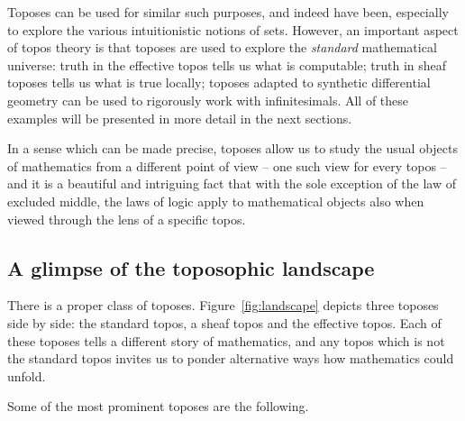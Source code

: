 \documentclass[graybox]{svmult}
\renewcommand{\_}{\mathpunct{.}\,}
\newcommand{\effective}{ef{}fective\xspace}
\newcommand{\?}{\,{:}\,}
\begin{document}
Toposes can be used for similar such purposes, and indeed have been,
especially to explore the various intuitionistic notions of sets. However, an important
aspect of topos theory is that toposes are used to explore the \emph{standard}
mathematical universe: truth in the \effective topos tells us what is
computable; truth in sheaf toposes tells us what is true locally; toposes
adapted to synthetic differential geometry can be used to rigorously work with
infinitesimals. All of these examples will be presented in more detail in the
next sections.

In a sense which can be made precise, toposes allow us to study the usual
objects of mathematics from a different point of view -- one such view for
every topos -- and it is a beautiful and intriguing fact that with the sole
exception of the law of excluded middle, the laws of logic apply to
mathematical objects also when viewed through the lens of a specific topos.


\subsection{A glimpse of the toposophic landscape}
There is a proper class of toposes. Figure~\ref{fig:landscape} depicts three
toposes side by side: the standard topos, a sheaf topos and the \effective
topos. Each of these toposes tells a different story of mathematics, and any
topos which is not the standard topos invites us to ponder alternative ways how
mathematics could unfold.

Some of the most prominent toposes are the following.
\end{document}
